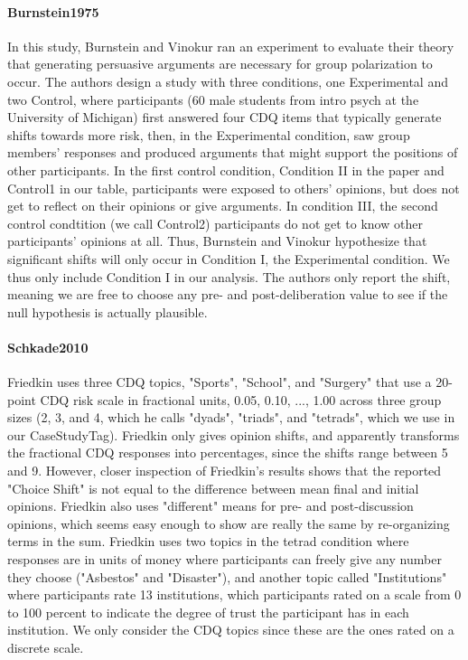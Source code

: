 \documentclass[12pt, letterpaper]{article}
\begin{document}
\paragraph{{Burnstein1975}} In this study, Burnstein and Vinokur ran an experiment to evaluate their theory
that generating persuasive arguments are necessary for group polarization to occur. The authors design a study with
three conditions, one Experimental and two Control, where participants (60 male students from intro psych at the
University of Michigan) first answered four CDQ items that typically generate shifts towards more risk, then, in the
Experimental condition, saw group members' responses and produced arguments that might support the positions of
other participants. In the first control condition, Condition II in the paper and Control1 in our table,
participants were exposed to others' opinions, but does not get to reflect on their opinions or give arguments. In
condition III, the second control condtition (we call Control2) participants do not get to know other participants'
opinions at all. Thus, Burnstein and Vinokur hypothesize that significant shifts will only occur in Condition I, the
Experimental condition. We thus only include Condition I in our analysis. The authors only report the shift, meaning
we are free to choose any pre- and post-deliberation value to see if the null hypothesis is actually plausible.  

\paragraph{{Schkade2010}} Friedkin uses three CDQ topics, "Sports", "School", and "Surgery" that use a
20-point CDQ risk scale in fractional units, 0.05, 0.10, ..., 1.00 across three group sizes (2, 3, and 4, which he
calls "dyads", "triads", and "tetrads", which we use in our CaseStudyTag). Friedkin only gives opinion shifts, and
apparently transforms the fractional CDQ responses into percentages, since the shifts range between 5 and 9.
However, closer inspection of Friedkin's results shows that the reported "Choice Shift" is not equal to the
difference between mean final and initial opinions. Friedkin also uses "different" means for pre- and
post-discussion opinions, which seems easy enough to show are really the same by re-organizing terms in the sum.
Friedkin uses two topics in the tetrad condition where responses are in units of money where participants can freely
give any number they choose ("Asbestos" and "Disaster"), and another topic called "Institutions" where participants
rate 13 institutions, which participants rated on a scale from 0 to 100 percent to indicate the degree of trust the
participant has in each institution. We only consider the CDQ topics since these are the ones rated on a discrete
scale. 
\end{document}
